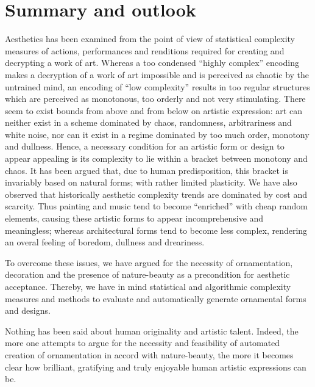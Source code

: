 \documentclass[rmp,amssymb,showpacs,showkeys,12pt,preprint]{revtex4}
\begin{document}
\section{Summary and outlook}

Aesthetics has been examined from the point of view of statistical complexity measures of actions, performances and renditions required for creating and decrypting a work of art.
Whereas a too condensed ``highly complex'' encoding makes a decryption of a work of art impossible and is perceived as chaotic by the untrained mind,
an encoding of ``low complexity'' results in too regular structures which are perceived as monotonous, too orderly and not very stimulating.
There seem to exist bounds from above and from below on artistic expression:
art can neither exist in a scheme dominated by chaos, randomness, arbitrariness and white noise, nor can it exist in a regime dominated by too much order, monotony and dullness.
Hence, a necessary condition for an artistic form or design to appear appealing is its complexity to lie within a bracket between monotony and chaos.
It has been argued that, due to human predisposition, this bracket is invariably based on natural forms; with rather limited plasticity.
We have also observed that historically aesthetic complexity trends are dominated by cost and scarcity.
Thus painting and music tend to become ``enriched'' with cheap random elements, causing these artistic forms to appear incomprehensive and meaningless;
whereas architectural forms tend to become less complex, rendering an overal feeling of boredom, dullness and dreariness.

To overcome these issues, we have argued for the necessity of ornamentation, decoration and the presence of nature-beauty as a precondition for aesthetic acceptance.
Thereby, we have in mind statistical and algorithmic complexity measures and methods to evaluate and automatically generate ornamental forms and designs.

Nothing has been said about human originality and artistic talent.
Indeed, the more one attempts to argue for the necessity and feasibility of
automated creation of ornamentation in accord with nature-beauty, the more
it becomes clear how brilliant, gratifying and truly enjoyable human
artistic expressions can be.
\end{document}
